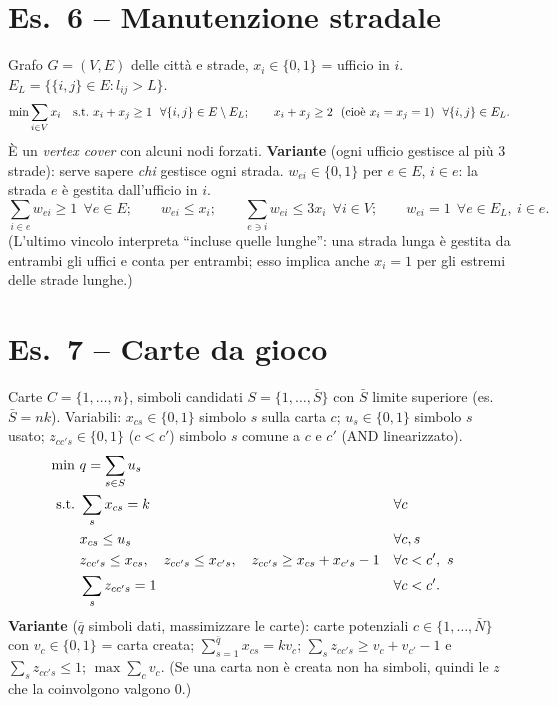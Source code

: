 \section*{Es.\ 6 -- Manutenzione stradale}
Grafo $G=(V,E)$ delle città e strade, $x_i\in\{0,1\}$ = ufficio in $i$. $E_L=\{\{i,j\}\in E: l_{ij}>L\}$.
\[ \min\sum_{i\in V}x_i\quad\st\ x_i+x_j\ge1\ \ \forall\{i,j\}\in E\setminus E_L;\qquad x_i+x_j\ge 2\ \ (\text{cioè }x_i=x_j=1)\ \ \forall\{i,j\}\in E_L. \]
È un \emph{vertex cover} con alcuni nodi forzati.
\textbf{Variante} (ogni ufficio gestisce al più 3 strade): serve sapere \emph{chi} gestisce ogni strada. $w_{ei}\in\{0,1\}$ per $e\in E$, $i\in e$: la strada $e$ è gestita dall'ufficio in $i$.
\[ \sum_{i\in e}w_{ei}\ge1\ \ \forall e\in E;\qquad w_{ei}\le x_i;\qquad \sum_{e\ni i}w_{ei}\le 3x_i\ \ \forall i\in V;\qquad w_{ei}=1\ \ \forall e\in E_L,\ i\in e. \]
(L'ultimo vincolo interpreta ``incluse quelle lunghe'': una strada lunga è gestita da entrambi gli uffici e conta per entrambi; esso implica anche $x_i=1$ per gli estremi delle strade lunghe.)

\section*{Es.\ 7 -- Carte da gioco}
Carte $C=\{1,\dots,n\}$, simboli candidati $S=\{1,\dots,\bar S\}$ con $\bar S$ limite superiore (es.\ $\bar S=nk$).
Variabili: $x_{cs}\in\{0,1\}$ simbolo $s$ sulla carta $c$; $u_s\in\{0,1\}$ simbolo $s$ usato; $z_{cc's}\in\{0,1\}$ ($c<c'$) simbolo $s$ comune a $c$ e $c'$ (AND linearizzato).
\begin{align*}
\min\ & q=\sum_{s\in S}u_s\\
\text{s.t.}\ & \sum_sx_{cs}=k && \forall c\\
& x_{cs}\le u_s && \forall c,s\\
& z_{cc's}\le x_{cs},\quad z_{cc's}\le x_{c's},\quad z_{cc's}\ge x_{cs}+x_{c's}-1 && \forall c<c',\ s\\
& \sum_sz_{cc's}=1 && \forall c<c'.
\end{align*}
\textbf{Variante} ($\bar q$ simboli dati, massimizzare le carte): carte potenziali $c\in\{1,\dots,\bar N\}$ con $v_c\in\{0,1\}$ = carta creata; $\sum_{s=1}^{\bar q}x_{cs}=kv_c$; $\sum_sz_{cc's}\ge v_c+v_{c'}-1$ e $\sum_sz_{cc's}\le 1$; $\max\sum_cv_c$. (Se una carta non è creata non ha simboli, quindi le $z$ che la coinvolgono valgono 0.)

